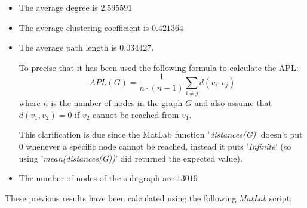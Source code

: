 \documentclass{article}
\begin{document}
    \begin{itemize}
        \item The average degree is \(2.595591\)
        \item The average clustering coefficient is \(0.421364\)
        \item The average path length is \(0.034427\).\newline
        
        \par\noindent To precise that it has been used the following formula to calculate the APL:
        \[APL(G)=\frac{1}{n \cdot (n-1)} \sum_{i \neq j}d(v_{i},v_{j})\]
        where \(n\) is the number of nodes in the graph \(G\) and also assume that \(d(v_{1},v_{2})=0\) if \(v_{2}\) cannot be reached from \(v_{1}\).\newline
        
        \par\noindent This clarification is due since the MatLab function '\textit{distances(G)}' doesn't put \(0\) whenever a specific node cannot be reached, instead it puts '\textit{Infinite}' (so using '\textit{mean(distances(G))}' did returned the expected value).
        
        \item The number of nodes of the sub-graph are \(13019\)
    \end{itemize}
    \bigskip
    \par\noindent These previous results have been calculated using the following \textit{MatLab} script:
    \newline
\end{document}
